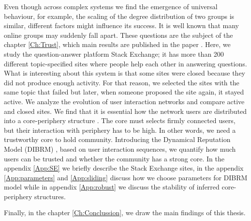 Even though across complex systems we find the emergence of universal behaviour, for example, the scaling of the degree distribution of two groups is similar, different factors might influence its success. It is well known that many online groups may suddenly fall apart. These questions are the subject of the chapter \ref{Ch:Trust}, which main results are published in the paper \cite{vranic2022sustainability}. Here, we study the question-answer platform Stack Exchange; it has more than 200 different topic-specified sites where people help each other in answering questions. What is interesting about this system is that some sites were closed because they did not produce enough activity. For that reason, we selected the sites with the same topic that failed but later, when someone proposed the site again, it stayed active. We analyze the evolution of user interaction networks and compare active and closed sites. We find that it is essential how the network users are distributed into a core-periphery structure \cite{gallagher2020clarified}. The core must selects firmly connected users, but their interaction with periphery has to be high. In other words, we need a trustworthy core to hold community. Introducing the Dynamical Reputation Model (DIBRM) \cite{melnikovDynamicInteractionBasedReputation2018}, based on user interaction sequences, we quantify how much users can be trusted and whether the community has a strong core. In the appendix \ref{App:SE} we briefly describe the Stack Exchange sites, in the appendix \ref{App:parameters} and \ref{App:sliding} discuss how we choose parameters  for DIBRM model while in appendix \ref{App:robust} we discuss the stability of inferred core-periphery structures. 

Finally, in the chapter \ref{Ch:Conclussion}, we draw the main findings of this thesis. 

\newpage










